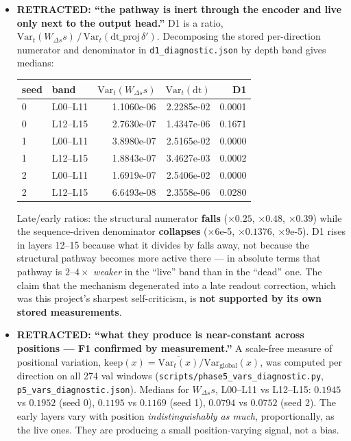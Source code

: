 \documentclass[11pt,a4paper]{article}
\newcommand{\code}[1]{\texttt{\small #1}}
\begin{document}
\begin{itemize}

\item \textbf{RETRACTED: ``the pathway is inert through the encoder and live
only next to the output head.''} D1 is a ratio,
$\mathrm{Var}_t(W_{\Delta s}s)\,/\,\mathrm{Var}_t(\mathrm{dt\_proj}\,\delta')$.
Decomposing the stored per-direction numerator and denominator in
\code{d1\_diagnostic.json} by depth band gives medians:

\begin{center}
\begin{tabular}{llrrr}
\toprule
seed & band & $\mathrm{Var}_t(W_{\Delta s}s)$ & $\mathrm{Var}_t(\mathrm{dt})$ & D1 \\
\midrule
0 & L00--L11 & 1.1060e-06 & 2.2285e-02 & 0.0001 \\
0 & L12--L15 & 2.7630e-07 & 1.4347e-06 & 0.1671 \\
1 & L00--L11 & 3.8980e-07 & 2.5165e-02 & 0.0000 \\
1 & L12--L15 & 1.8843e-07 & 3.4627e-03 & 0.0002 \\
2 & L00--L11 & 1.6919e-07 & 2.5406e-02 & 0.0000 \\
2 & L12--L15 & 6.6493e-08 & 2.3558e-06 & 0.0280 \\
\bottomrule
\end{tabular}
\end{center}

Late/early ratios: the structural numerator \textbf{falls} ($\times0.25$,
$\times0.48$, $\times0.39$) while the sequence-driven denominator
\textbf{collapses} ($\times6$e-5, $\times0.1376$, $\times9$e-5). D1 rises in
layers 12--15 because what it divides by falls away, not because the structural
pathway becomes more active there --- in absolute terms that pathway is
$2$--$4\times$ \emph{weaker} in the ``live'' band than in the ``dead'' one. The
claim that the mechanism degenerated into a late readout correction, which was
this project's sharpest self-criticism, is \textbf{not supported by its own
stored measurements}.

\item \textbf{RETRACTED: ``what they produce is near-constant across positions
--- F1 confirmed by measurement.''} A scale-free measure of positional
variation, $\mathrm{keep}(x) = \overline{\mathrm{Var}_t(x)} /
\mathrm{Var}_{\text{global}}(x)$, was computed per direction on all 274 val
windows (\code{scripts/phase5\_vars\_diagnostic.py},
\code{p5\_vars\_diagnostic.json}). Medians for $W_{\Delta s}s$, L00--L11 vs
L12--L15: $0.1945$ vs $0.1952$ (seed 0), $0.1195$ vs $0.1169$ (seed 1),
$0.0794$ vs $0.0752$ (seed 2). The early layers vary with position
\emph{indistinguishably as much}, proportionally, as the live ones. They are
producing a small position-varying signal, not a bias.


\end{itemize}
\end{document}

